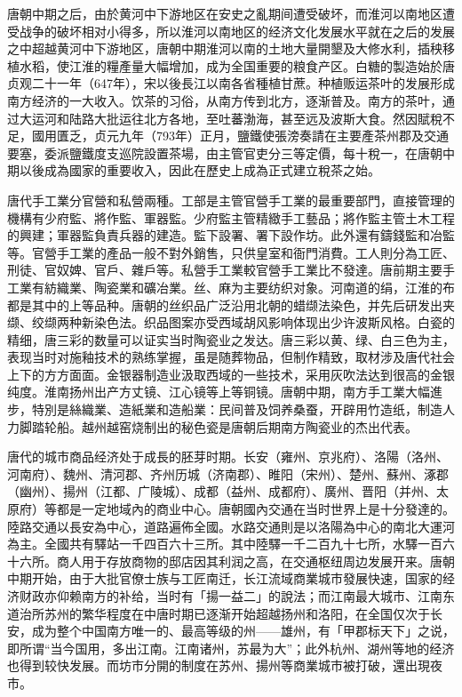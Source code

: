 唐朝中期之后，由於黄河中下游地区在安史之亂期间遭受破坏，而淮河以南地区遭受战争的破坏相对小得多，所以淮河以南地区的经济文化发展水平就在之后的发展之中超越黄河中下游地区，唐朝中期淮河以南的土地大量開墾及大修水利，插秧移植水稻，使江淮的糧產量大幅增加，成为全国重要的粮食产区。白糖的製造始於唐贞观二十一年（647年），宋以後長江以南各省種植甘蔗。种植贩运茶叶的发展形成南方经济的一大收入。饮茶的习俗，从南方传到北方，逐渐普及。南方的茶叶，通过大运河和陆路大批运往北方各地，至吐蕃渤海，甚至远及波斯大食。然因賦稅不足，國用匱乏，贞元九年（793年）正月，鹽鐵使張滂奏請在主要產茶州郡及交通要塞，委派鹽鐵度支巡院設置茶場，由主管官吏分三等定價，每十稅一，在唐朝中期以後成為國家的重要收入，因此在歷史上成為正式建立稅茶之始。

唐代手工業分官營和私營兩種。工部是主管官營手工業的最重要部門，直接管理的機構有少府監、將作監、軍器監。少府監主管精緻手工藝品；將作監主管土木工程的興建；軍器監負責兵器的建造。監下設署、署下設作坊。此外還有鑄錢監和冶監等。官營手工業的產品一般不對外銷售，只供皇室和衙門消費。工人則分為工匠、刑徒、官奴婢、官戶、雜戶等。私營手工業較官營手工業比不發達。唐前期主要手工業有紡織業、陶瓷業和礦冶業。丝、麻为主要纺织对象。河南道的绢，江淮的布都是其中的上等品种。唐朝的丝织品广泛沿用北朝的蜡缬法染色，并先后研发出夹缬、绞缬两种新染色法。织品图案亦受西域胡风影响体现出少许波斯风格。白瓷的精细，唐三彩的数量可以证实当时陶瓷业之发达。唐三彩以黄、绿、白三色为主，表现当时对施釉技术的熟练掌握，虽是随葬物品，但制作精致，取材涉及唐代社会上下的方方面面。金银器制造业汲取西域的一些技术，采用灰吹法达到很高的金银纯度。淮南扬州出产方丈镜、江心镜等上等铜镜。唐朝中期，南方手工業大幅進步，特別是絲織業、造紙業和造船業：民间普及饲养桑蚕，开辟用竹造纸，制造人力脚踏轮船。越州越窑烧制出的秘色瓷是唐朝后期南方陶瓷业的杰出代表。

唐代的城市商品经济处于成長的胚芽时期。长安（雍州、京兆府）、洛陽（洛州、河南府）、魏州、清河郡、齐州历城（济南郡）、睢阳（宋州）、楚州、蘇州、涿郡（幽州）、揚州（江都、广陵城）、成都（益州、成都府）、廣州、晋阳（并州、太原府）等都是一定地域內的商业中心。唐朝國內交通在当时世界上是十分發達的。陸路交通以長安為中心，道路遍佈全國。水路交通則是以洛陽為中心的南北大運河為主。全國共有驛站一千四百六十三所。其中陸驛一千二百九十七所，水驛一百六十六所。商人用于存放商物的邸店因其利润之高，在交通枢纽周边发展开来。唐朝中期开始，由于大批官僚士族与工匠南迁，长江流域商業城市發展快速，国家的经济财政亦仰赖南方的补给，当时有「揚一益二」的說法；而江南最大城市、江南东道治所苏州的繁华程度在中唐时期已逐渐开始超越扬州和洛阳，在全国仅次于长安，成为整个中国南方唯一的、最高等级的州——雄州，有「甲郡标天下」之说，即所谓“当今国用，多出江南。江南诸州，苏最为大”；此外杭州、湖州等地的经济也得到较快发展。而坊市分開的制度在苏州、揚州等商業城市被打破，還出現夜市。

